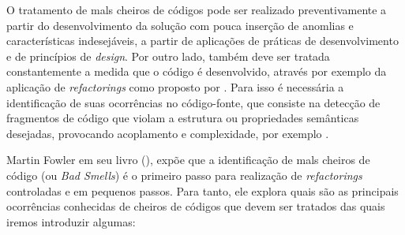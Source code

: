 %

O tratamento de mals cheiros de códigos pode ser realizado preventivamente a partir do desenvolvimento da solução com pouca inserção de anomlias e características indesejáveis, a partir de aplicações de práticas de desenvolvimento e de princípios de \emph{design}. Por outro lado, também deve ser tratada constantemente a medida que o código é desenvolvido, através por exemplo da aplicação de \emph{refactorings} como proposto por \cite{fowler1999}. Para isso é necessária a identificação de suas ocorrências no código-fonte, que consiste na detecção de fragmentos de código que violam a estrutura ou propriedades semânticas desejadas, provocando acoplamento e complexidade, por exemplo \cite{mansoor2014}.

%

Martin Fowler em seu livro (\citeyear{fowler1999}), expõe que a identificação de mals cheiros de código (ou \emph{Bad Smells}) é o primeiro passo para realização de \emph{refactorings} controladas e em pequenos passos. Para tanto, ele explora quais são as principais ocorrências conhecidas de cheiros de códigos que devem ser tratados das quais iremos introduzir algumas:

